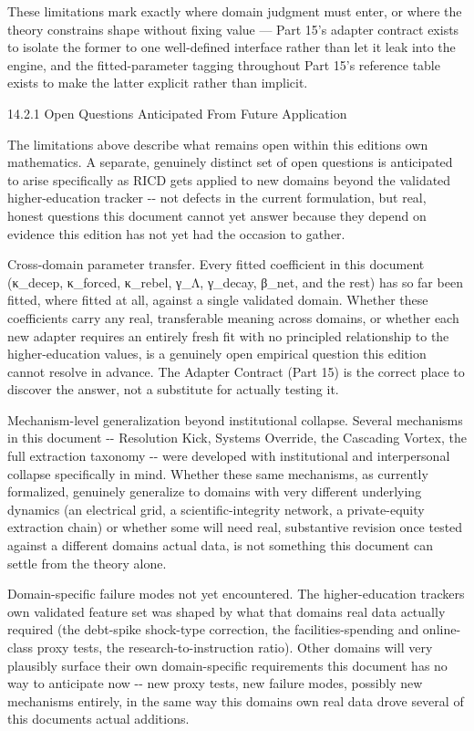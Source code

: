 \documentclass[
]{article}
\begin{document}
These limitations mark exactly where domain judgment must enter, or
where the theory constrains shape without fixing value --- Part 15's
adapter contract exists to isolate the former to one well-defined
interface rather than let it leak into the engine, and the
fitted-parameter tagging throughout Part 15's reference table exists to
make the latter explicit rather than implicit.

14.2.1 Open Questions Anticipated From Future Application

The limitations above describe what remains open within this editions
own mathematics. A separate, genuinely distinct set of open questions is
anticipated to arise specifically as RICD gets applied to new domains
beyond the validated higher-education tracker -\/- not defects in the
current formulation, but real, honest questions this document cannot yet
answer because they depend on evidence this edition has not yet had the
occasion to gather.

Cross-domain parameter transfer. Every fitted coefficient in this
document (κ\_decep, κ\_forced, κ\_rebel, γ\_Λ, γ\_decay, β\_net, and the
rest) has so far been fitted, where fitted at all, against a single
validated domain. Whether these coefficients carry any real,
transferable meaning across domains, or whether each new adapter
requires an entirely fresh fit with no principled relationship to the
higher-education values, is a genuinely open empirical question this
edition cannot resolve in advance. The Adapter Contract (Part 15) is the
correct place to discover the answer, not a substitute for actually
testing it.

Mechanism-level generalization beyond institutional collapse. Several
mechanisms in this document -\/- Resolution Kick, Systems Override, the
Cascading Vortex, the full extraction taxonomy -\/- were developed with
institutional and interpersonal collapse specifically in mind. Whether
these same mechanisms, as currently formalized, genuinely generalize to
domains with very different underlying dynamics (an electrical grid, a
scientific-integrity network, a private-equity extraction chain) or
whether some will need real, substantive revision once tested against a
different domains actual data, is not something this document can settle
from the theory alone.

Domain-specific failure modes not yet encountered. The higher-education
trackers own validated feature set was shaped by what that domains real
data actually required (the debt-spike shock-type correction, the
facilities-spending and online-class proxy tests, the
research-to-instruction ratio). Other domains will very plausibly
surface their own domain-specific requirements this document has no way
to anticipate now -\/- new proxy tests, new failure modes, possibly new
mechanisms entirely, in the same way this domains own real data drove
several of this documents actual additions.
\end{document}
